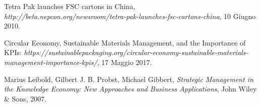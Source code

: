 \documentclass[paper=a4, fontsize=11pt,x11names]{report}
\begin{document}


\begin{thebibliography}{9}

 
	Tetra Pak launches FSC cartons in China, \textit{http://beta.nepcon.org/newsroom/tetra-pak-launches-fsc-cartons-china},
	10 Giugno 2010.
	
	Circular Economy, Sustainable Materials Management, and the Importance of KPIs: \textit{https://sustainablepackaging.org/circular-economy-sustainable-materials-management-importance-kpis/},
	17 Maggio 2017.


 Marius Leibold, Gilbert J. B. Probst, Michael Gibbert,
  \textit{Strategic Management in the Knowledge Economy: New Approaches and Business Applications},
  John Wiley \& Sons,
 2007.

\end{thebibliography}


\end{document}
